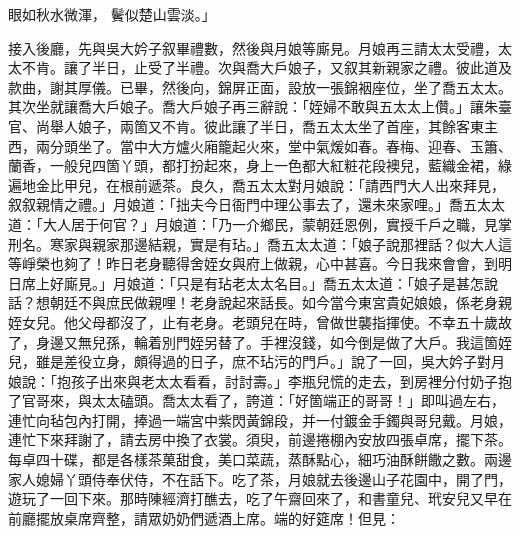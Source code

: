 眼如秋水微渾，  鬢似楚山雲淡。」

接入後廳，先與吳大妗子叙畢禮數，然後與月娘等廝見。月娘再三請太太受禮，太太不肯。讓了半日，止受了半禮。次與喬大戶娘子，又叙其新親家之禮。彼此道及款曲，謝其厚儀。已畢，然後向，錦屏正面，設放一張錦裀座位，坐了喬五太太。其次坐就讓喬大戶娘子。喬大戶娘子再三辭說：「姪婦不敢與五太太上儹。」讓朱臺官、尚舉人娘子，兩箇又不肯。彼此讓了半日，喬五太太坐了首座，其餘客東主西，兩分頭坐了。當中大方爐火廂籠起火來，堂中氣煖如春。春梅、迎春、玉簫、蘭香，一般兒四箇丫頭，都打扮起來，身上一色都大紅粧花段襖兒，藍織金裙，綠遍地金比甲兒，在根前遞茶。良久，喬五太太對月娘說：「請西門大人出來拜見，叙叙親情之禮。」月娘道：「拙夫今日衙門中理公事去了，還未來家哩。」喬五太太道：「大人居于何官？」月娘道：「乃一介鄉民，蒙朝廷恩例，實授千戶之職，見掌刑名。寒家與親家那邊結親，實是有玷。」喬五太太道：「娘子說那裡話？似大人這等崢榮也夠了！昨日老身聽得舍姪女與府上做親，心中甚喜。今日我來會會，到明日席上好廝見。」月娘道：「只是有玷老太太名目。」喬五太太道：「娘子是甚怎說話？想朝廷不與庶民做親哩！老身說起來話長。如今當今東宮貴妃娘娘，係老身親姪女兒。他父母都沒了，止有老身。老頭兒在時，曾做世襲指揮使。不幸五十歲故了，身邊又無兒孫，輪着別門姪另替了。手裡沒錢，如今倒是做了大戶。我這箇姪兒，雖是差役立身，頗得過的日子，庶不玷污的門戶。」說了一回，吳大妗子對月娘說：「抱孩子出來與老太太看看，討討壽。」李瓶兒慌的走去，到房裡分付奶子抱了官哥來，與太太磕頭。喬太太看了，誇道：「好箇端正的哥哥！」即叫過左右，連忙向毡包內打開，捧過一端宮中紫閃黃錦段，并一付鍍金手鐲與哥兒戴。月娘，連忙下來拜謝了，請去房中換了衣裳。須臾，前邊捲棚內安放四張卓席，擺下茶。每卓四十碟，都是各樣茶菓甜食，美口菜蔬，蒸酥點心，細巧油酥餅饊之數。兩邊家人媳婦丫頭侍奉伏侍，不在話下。吃了茶，月娘就去後邊山子花園中，開了門，遊玩了一回下來。那時陳經濟打醮去，吃了午齋回來了，和書童兒、玳安兒又早在前廳擺放桌席齊整，請眾奶奶們遞酒上席。端的好筵席！但見：

